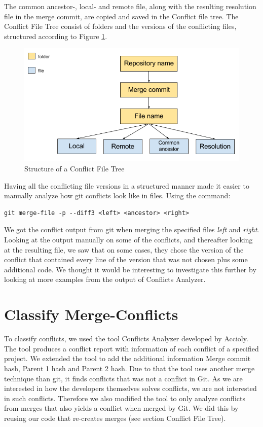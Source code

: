 The common ancestor-, local- and remote file, along with the resulting resolution file in the merge commit, are copied and saved in the Conflict file tree. The Conflict File Tree consist of folders and the versions of the conflicting files, structured according to Figure \ref{fig:cft}.\\
\begin{figure}[H]
\centering
\includegraphics[width=400pt]{figure/conflicts.png}
\caption{Structure of a Conflict File Tree}\label{fig:cft}
\end{figure}

Having all the conflicting file versions in a structured manner made it easier to manually analyze how git conflicts look like in files. Using the command:
\lstset{language=Bash,numbers=left,xleftmargin=2em,frame=single,framexleftmargin=1.5em}
\begin{lstlisting}[frame=single]
git merge-file -p --diff3 <left> <ancestor> <right>
\end{lstlisting}
We got the conflict output from git when merging the specified files \textit{left} and \textit{right}. Looking at the output manually on some of the conflicts, and thereafter looking at the resulting file, we saw that on some cases, they chose the version of the conflict that contained every line of the version that was not chosen plus some additional code. We thought it would be interesting to investigate this further by looking at more examples from the output of Conflicts Analyzer.

\section{Classify Merge-Conflicts}
To classify conflicts, we used the tool Conflicts Analyzer developed by Accioly. The tool produces a conflict report with information of each conflict of a specified project. We extended the tool to add the additional information Merge commit hash, Parent 1 hash and Parent 2 hash. Due to that the tool uses another merge technique than git, it finds conflicts that was not a conflict in Git. As we are interested in how the developers themselves solves conflicts, we are not interested in such conflicts. Therefore we also modified the tool to only analyze conflicts from merges that also yields a conflict when merged by Git. We did this by reusing our code that re-creates merges (see section Conflict File Tree).

